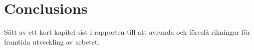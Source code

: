 \chapter{Conclusions}\label{cha:conc}
%
Sätt av ett kort kapitel sist i rapporten till att avrunda och föreslå rikningar för framtida utveckling av arbetet.
